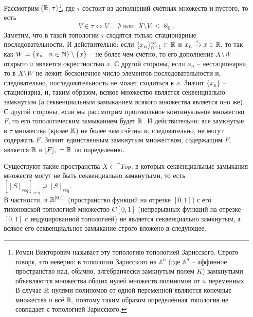\begin{example}
    Рассмотрим $(\mathbb{R}, \tau)$\footnote{Роман Викторович называет эту топологию топологией Зарисского. Строго говоря, это неверно: в топологии Зарисского на $\mathbb{A}^n$ (где $\mathbb{A}^n$ -- аффинное пространство над, обычно, алгебраически замкнутым полем $K$) замкнутыми объявляются множества общих нулей множеств полиномов от $n$ переменных.
    В случае $\mathbb{R}$ нулями полиномов от одной переменной являются конечные множества и всё $\mathbb{R}$, поэтому таким образом определённая топология не совпадает с топологией Зарисского.
    }, где $\tau$ состоит из дополнений счётных множеств и пустого, то есть
    \[
        V \in \tau \Longleftrightarrow V = \emptyset \text{ или } |X \setminus V| \leq \aleph_0.
    \]
    Заметим, что в такой топологии $\tau$ сходятся только стационарные последовательности.
    И действительно: если $\{x_n\}_{n = 1}^{\infty} \subset \mathbb{R}$ и $x_n \xrightarrow{\tau} x \in \mathbb{R}$, то так как $W = \{x_n \mid n \in \mathbb{N}\} \setminus \{x\}$ -- не более чем счётно, то его дополнение $X \setminus W$ -- открыто и является окрестностью $x$.
    С другой стороны, если $x_n$ -- нестационарна, то в $X \setminus W$ не лежит бесконечное число элементов последовательности и, следовательно, последовательность не может сходиться к $x$.
    Значит $\{x_n\}$ -- стационарна, и, таким образом, всякое множество является секвенциально замкнутым (а секвенциальным замыканием всякого множества является оно же). \\
    С другой стороны, если мы рассмотрим произвольное континуальное множество $F$, то его топологическим замыканием будет $\mathbb{R}$.
    И действительно: все замкнутые в $\tau$ множества (кроме $\mathbb{R}$) не более чем счётны и, следовательно, не могут содержать $F$.
    Значит единственным замкнутым множеством, содержащим $F$, является $\mathbb{R}$ и $[F]_\tau = \mathbb{R}$ по определению.
\end{example}
\begin{note}
    Существуют такие пространства $X \in \cat{Top}$, в которых секвенциальные замыкания множеств могут не быть секвенциально замкнутыми, то есть $\left[[S]_{seq}\right]_{seq} \supsetneq [S]_{seq}$. \\
    В частности, в $\mathbb{R}^{[0, 1]}$ (пространство функций на отрезке $[0, 1]$) с его тихоновской топологией множество $C[0, 1]$ (непрерывных функций на отрезке $[0, 1]$ с индуцированной топологией) не является секвенциально замкнутым, а всякое его секвенциальное замыкание строго вложено в следующее.
\end{note}
